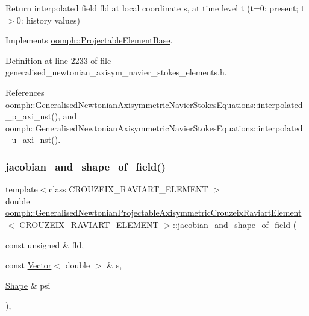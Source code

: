 Return interpolated field fld at local coordinate s, at time level t (t=0\+: present; t$>$0\+: history values) 



Implements \hyperlink{classoomph_1_1ProjectableElementBase_ae4da5b565b6d333be2f5920f7be763cd}{oomph\+::\+Projectable\+Element\+Base}.



Definition at line 2233 of file generalised\+\_\+newtonian\+\_\+axisym\+\_\+navier\+\_\+stokes\+\_\+elements.\+h.



References oomph\+::\+Generalised\+Newtonian\+Axisymmetric\+Navier\+Stokes\+Equations\+::interpolated\+\_\+p\+\_\+axi\+\_\+nst(), and oomph\+::\+Generalised\+Newtonian\+Axisymmetric\+Navier\+Stokes\+Equations\+::interpolated\+\_\+u\+\_\+axi\+\_\+nst().

\mbox{\label{classoomph_1_1GeneralisedNewtonianProjectableAxisymmetricCrouzeixRaviartElement_ac3ff1dab92b90bee99a1e70e75bb549b}} 
\subsubsection{\texorpdfstring{jacobian\+\_\+and\+\_\+shape\+\_\+of\+\_\+field()}{jacobian\_and\_shape\_of\_field()}}
{\footnotesize\ttfamily template$<$class C\+R\+O\+U\+Z\+E\+I\+X\+\_\+\+R\+A\+V\+I\+A\+R\+T\+\_\+\+E\+L\+E\+M\+E\+NT $>$ \\
double \hyperlink{classoomph_1_1GeneralisedNewtonianProjectableAxisymmetricCrouzeixRaviartElement}{oomph\+::\+Generalised\+Newtonian\+Projectable\+Axisymmetric\+Crouzeix\+Raviart\+Element}$<$ C\+R\+O\+U\+Z\+E\+I\+X\+\_\+\+R\+A\+V\+I\+A\+R\+T\+\_\+\+E\+L\+E\+M\+E\+NT $>$\+::jacobian\+\_\+and\+\_\+shape\+\_\+of\+\_\+field (\begin{DoxyParamCaption}\item[{const unsigned \&}]{fld,  }\item[{const \hyperlink{classoomph_1_1Vector}{Vector}$<$ double $>$ \&}]{s,  }\item[{\hyperlink{classoomph_1_1Shape}{Shape} \&}]{psi }\end{DoxyParamCaption})\hspace{0.3cm}{\ttfamily [inline]}, {\ttfamily [virtual]}}



